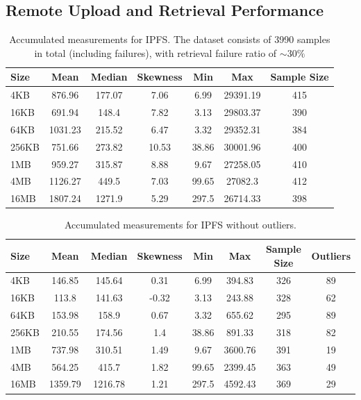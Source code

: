 \subsection{Remote Upload and Retrieval Performance}\label{subsection:evaluation_remote}

\begin{table}[H]
\centering
\begin{small}
\caption{Accumulated measurements for IPFS. The dataset consists of 3990 samples in total (including failures), with retrieval failure ratio of $\sim 30\%$ }
\begin{tabular}{@{}lcccccc@{}}
\toprule
Size & Mean & Median & Skewness & Min & Max & Sample Size \\ \midrule
4KB & 876.96 & 177.07 & 7.06 & 6.99 & 29391.19 & 415\\
16KB & 691.94 & 148.4 & 7.82 & 3.13 & 29803.37 & 390\\
64KB & 1031.23 & 215.52 & 6.47 & 3.32 & 29352.31 & 384\\
256KB & 751.66 & 273.82 & 10.53 & 38.86 & 30001.96 & 400\\
1MB & 959.27 & 315.87 & 8.88 & 9.67 & 27258.05 & 410\\
4MB & 1126.27 & 449.5 & 7.03 & 99.65 & 27082.3 & 412\\
16MB & 1807.24 & 1271.9 & 5.29 & 297.5 & 26714.33 & 398\\
\bottomrule
\end{tabular}
\end{small}
\end{table}

\begin{table}[H]
\centering
\begin{small}
\caption{Accumulated measurements for IPFS without outliers.}
\begin{tabular}{@{}lccccccc@{}}
\toprule
Size & Mean & Median & Skewness & Min & Max & Sample Size & Outliers \\ \midrule
4KB & 146.85 & 145.64 & 0.31 & 6.99 & 394.83 & 326 & 89\\
16KB & 113.8 & 141.63 & -0.32 & 3.13 & 243.88 & 328 & 62\\
64KB & 153.98 & 158.9 & 0.67 & 3.32 & 655.62 & 295 & 89\\
256KB & 210.55 & 174.56 & 1.4 & 38.86 & 891.33 & 318 & 82\\
1MB & 737.98 & 310.51 & 1.49 & 9.67 & 3600.76 & 391 & 19\\
4MB & 564.25 & 415.7 & 1.82 & 99.65 & 2399.45 & 363 & 49\\
16MB & 1359.79 & 1216.78 & 1.21 & 297.5 & 4592.43 & 369 & 29\\
\bottomrule
\end{tabular}
\end{small}
\end{table}





